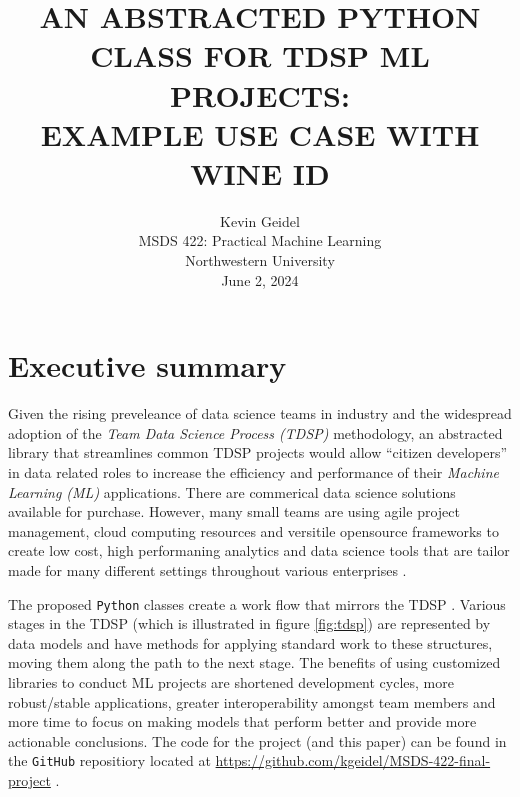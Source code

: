 \documentclass[12pt,letterpaper]{article}
\begin{document}
\selectfont
{}
\doublespacing
\setlength{\droptitle}{1in} 

\title{\large{AN ABSTRACTED PYTHON CLASS FOR TDSP ML PROJECTS: \\ EXAMPLE USE CASE WITH WINE ID \\\vspace{1.2in}}}

\author{
Kevin Geidel \\
MSDS 422: Practical Machine Learning \\
Northwestern University \\
June 2, 2024 \\
}

\date{}
\maketitle
\thispagestyle{empty}	
\clearpage
\setcounter{page}{1}

\section{Executive summary}
\tab Given the rising preveleance of data science teams in industry and the widespread adoption of the \emph{Team Data Science Process (TDSP)} methodology, an abstracted library that streamlines common TDSP projects would allow ``citizen developers'' in data related roles to increase the efficiency and performance of their \emph{Machine Learning (ML)} applications. There are commerical data science solutions available for purchase. However, many small teams are using agile project management, cloud computing resources and versitile opensource frameworks to create low cost, high performaning analytics and data science tools that are tailor made for many different settings throughout various enterprises \citep{Hyatt:2024}.

The proposed \texttt{Python} classes create a work flow that mirrors the TDSP \citep{tdsp:2024}. 
Various stages in the TDSP (which is illustrated in figure \ref{fig:tdsp}) are represented by data models and have methods for applying standard work to these structures, moving them along the path to the next stage.
The benefits of using customized libraries to conduct ML projects are shortened development cycles, more robust/stable applications, greater interoperability amongst team members and more time to focus on making models that perform better and provide more actionable conclusions. The code for the project (and this paper) can be found in the \texttt{GitHub} repositiory located at \url{https://github.com/kgeidel/MSDS-422-final-project} \citep{GeidelRepo:2024}.
\end{document}
